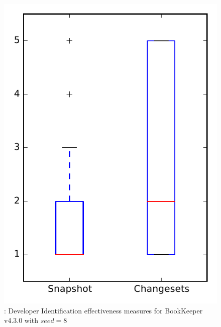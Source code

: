 
\begin{figure}
\centering
\includegraphics[height=0.4\textheight]{figures/dit_seed/rq1_bookkeeper_8}
\caption{\rtwo: Developer Identification effectiveness measures for BookKeeper v4.3.0 with $seed=8$}
\label{fig:dit_seed:rq1:bookkeeper}
\end{figure}
